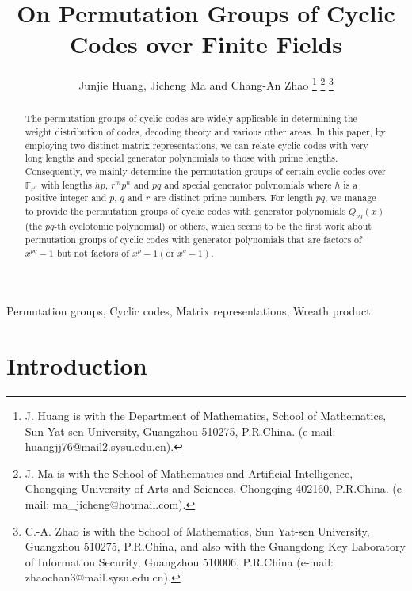 \documentclass[journal,12pt,onecolumn]{IEEEtran}
\begin{document}
\title{On Permutation Groups of Cyclic Codes over Finite Fields}
\author{Junjie Huang, Jicheng Ma and Chang-An Zhao
\thanks{J. Huang is with the Department of Mathematics, School of Mathematics, Sun Yat-sen University, Guangzhou 510275, P.R.China. (e-mail: huangjj76@mail2.sysu.edu.cn).}
\thanks{J. Ma is with the School of Mathematics and Artificial Intelligence, Chongqing University of Arts and Sciences, Chongqing 402160, P.R.China. (e-mail: ma\_jicheng@hotmail.com).}
\thanks{C.-A. Zhao is with the School of Mathematics, Sun Yat-sen University, Guangzhou 510275, P.R.China, and also with the Guangdong Key Laboratory of Information Security, Guangzhou 510006, P.R.China (e-mail: zhaochan3@mail.sysu.edu.cn).}

}


\maketitle

\begin{abstract}
   The permutation groups of cyclic codes are widely applicable in determining the weight distribution of codes, decoding theory and various other areas. In this paper, by employing two distinct matrix representations, we can relate cyclic codes with very long lengths and special generator polynomials to those with prime lengths. Consequently, we mainly determine the permutation groups of certain cyclic codes over $\mathbb{F}_{r^\alpha}$ with lengths $hp$, $r^mp^n$ and $pq$ and special generator polynomials where $h$ is a positive integer and $p$, $q$ and $r$ are distinct prime numbers. For length $pq$, we manage to provide the permutation groups of cyclic codes with generator polynomials $Q_{pq}(x)$(the $pq$-th cyclotomic polynomial) or others, which seems to be the first work about permutation groups of cyclic codes with generator polynomials that are factors of $x^{pq}-1$ but not factors of $x^p-1(\text{or }x^q-1)$.
\end{abstract}

\begin{IEEEkeywords}
Permutation groups, Cyclic codes, Matrix representations, Wreath product. 
\end{IEEEkeywords}



\section{Introduction}
\end{document}
